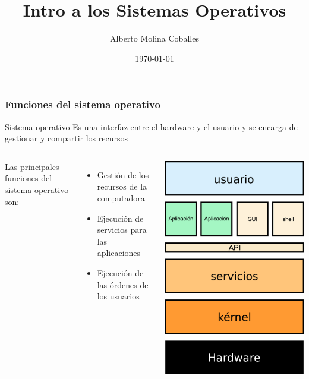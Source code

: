 \documentclass{beamer}
\author{Alberto Molina Coballes}
\title{Intro a los Sistemas Operativos}
\institute{IES Gonzalo Nazareno}
\date{\today}
\begin{document}
\begin{frame}[t,plain]
\titlepage
\end{frame}

\begin{frame}
  \frametitle{Funciones del sistema operativo}
  \begin{block}{Sistema operativo}
    Es una interfaz entre el hardware y el usuario y se encarga de gestionar y compartir los recursos
  \end{block}
  \begin{columns}
    Las principales funciones del sistema operativo son:
      \begin{itemize}
      \item Gestión de los recursos de la computadora
      \item Ejecución de servicios para las aplicaciones
      \item Ejecución de las órdenes de los usuarios
      \end{itemize}
    \begin{center}
      \includegraphics[width=\columnwidth]{SO.png}    
    \end{center}
  \end{columns}
\end{frame}
\end{document}
